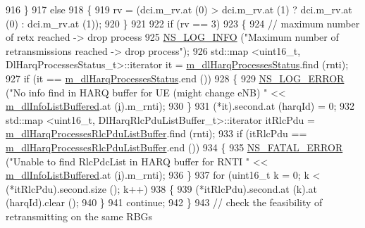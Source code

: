 \begin{DoxyCode}
916             \}
917           \textcolor{keywordflow}{else}
918             \{
919               rv = (dci.m\_rv.at (0) > dci.m\_rv.at (1) ? dci.m\_rv.at (0) : dci.m\_rv.at (1));
920             \}
921 
922           \textcolor{keywordflow}{if} (rv == 3)
923             \{
924               \textcolor{comment}{// maximum number of retx reached -> drop process}
925               \hyperlink{group__logging_gafbd73ee2cf9f26b319f49086d8e860fb}{NS\_LOG\_INFO} (\textcolor{stringliteral}{"Maximum number of retransmissions reached -> drop process"});
926               std::map <uint16\_t, DlHarqProcessesStatus\_t>::iterator it = 
      \hyperlink{classns3_1_1TdTbfqFfMacScheduler_a3d25806fc0b4360d668951f3a6b96b8d}{m\_dlHarqProcessesStatus}.find (rnti);
927               \textcolor{keywordflow}{if} (it == \hyperlink{classns3_1_1TdTbfqFfMacScheduler_a3d25806fc0b4360d668951f3a6b96b8d}{m\_dlHarqProcessesStatus}.end ())
928                 \{
929                   \hyperlink{group__logging_ga0261a8db1d4ac5f79417d117634fd455}{NS\_LOG\_ERROR} (\textcolor{stringliteral}{"No info find in HARQ buffer for UE (might change eNB) "} << 
      \hyperlink{classns3_1_1TdTbfqFfMacScheduler_aabf2460c78d16c5202cdcda020ba06dd}{m\_dlInfoListBuffered}.at (\hyperlink{bernuolliDistribution_8m_a6f6ccfcf58b31cb6412107d9d5281426}{i}).m\_rnti);
930                 \}
931               (*it).second.at (harqId) = 0;
932               std::map <uint16\_t, DlHarqRlcPduListBuffer\_t>::iterator itRlcPdu =  
      \hyperlink{classns3_1_1TdTbfqFfMacScheduler_a997b6649f2a69dd389d9a4381707b755}{m\_dlHarqProcessesRlcPduListBuffer}.find (rnti);
933               \textcolor{keywordflow}{if} (itRlcPdu == \hyperlink{classns3_1_1TdTbfqFfMacScheduler_a997b6649f2a69dd389d9a4381707b755}{m\_dlHarqProcessesRlcPduListBuffer}.end ())
934                 \{
935                   \hyperlink{group__fatal_ga5131d5e3f75d7d4cbfd706ac456fdc85}{NS\_FATAL\_ERROR} (\textcolor{stringliteral}{"Unable to find RlcPdcList in HARQ buffer for RNTI "} << 
      \hyperlink{classns3_1_1TdTbfqFfMacScheduler_aabf2460c78d16c5202cdcda020ba06dd}{m\_dlInfoListBuffered}.at (\hyperlink{bernuolliDistribution_8m_a6f6ccfcf58b31cb6412107d9d5281426}{i}).m\_rnti);
936                 \}
937               \textcolor{keywordflow}{for} (uint16\_t k = 0; k < (*itRlcPdu).second.size (); k++)
938                 \{
939                   (*itRlcPdu).second.at (k).at (harqId).clear ();
940                 \}
941               \textcolor{keywordflow}{continue};
942             \}
943           \textcolor{comment}{// check the feasibility of retransmitting on the same RBGs}

\end{DoxyCode}
